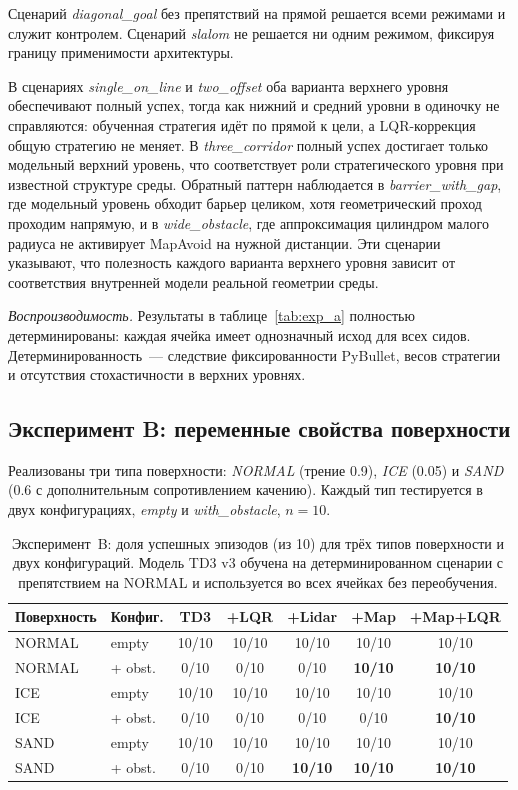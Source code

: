 \documentclass[11pt]{article}
\begin{document}
Сценарий \emph{diagonal\_goal} без препятствий на прямой решается всеми режимами и служит контролем. Сценарий \emph{slalom} не решается ни одним режимом, фиксируя границу применимости архитектуры.

В сценариях \emph{single\_on\_line} и \emph{two\_offset} оба варианта верхнего уровня обеспечивают полный успех, тогда как нижний и средний уровни в одиночку не справляются: обученная стратегия идёт по прямой к цели, а LQR-коррекция общую стратегию не меняет. В \emph{three\_corridor} полный успех достигает только модельный верхний уровень, что соответствует роли стратегического уровня при известной структуре среды. Обратный паттерн наблюдается в \emph{barrier\_with\_gap}, где модельный уровень обходит барьер целиком, хотя геометрический проход проходим напрямую, и в \emph{wide\_obstacle}, где аппроксимация цилиндром малого радиуса не активирует MapAvoid на нужной дистанции. Эти сценарии указывают, что полезность каждого варианта верхнего уровня зависит от соответствия внутренней модели реальной геометрии среды.

\textit{Воспроизводимость.} Результаты в таблице~\ref{tab:exp_a} полностью детерминированы: каждая ячейка имеет однозначный исход для всех сидов. Детерминированность~--- следствие фиксированности PyBullet, весов стратегии и отсутствия стохастичности в верхних уровнях.


\subsection{Эксперимент B: переменные свойства поверхности}
\label{sec:exp_b}

Реализованы три типа поверхности: \emph{NORMAL} (трение 0.9), \emph{ICE} (0.05) и \emph{SAND} (0.6 с дополнительным сопротивлением качению). Каждый тип тестируется в двух конфигурациях, \emph{empty} и \emph{with\_obstacle}, $n = 10$.

\begin{table}[h]
\begin{center}
\begin{tabular}{llccccc}
\toprule
Поверхность & Конфиг. & TD3 & +LQR & +Lidar & +Map & +Map+LQR \\
\midrule
NORMAL & empty     & 10/10 & 10/10 & 10/10 & 10/10 & 10/10 \\
NORMAL & + obst.   & 0/10  & 0/10  & 0/10  & \textbf{10/10} & \textbf{10/10} \\
ICE    & empty     & 10/10 & 10/10 & 10/10 & 10/10 & 10/10 \\
ICE    & + obst.   & 0/10  & 0/10  & 0/10  & 0/10  & \textbf{10/10} \\
SAND   & empty     & 10/10 & 10/10 & 10/10 & 10/10 & 10/10 \\
SAND   & + obst.   & 0/10  & 0/10  & \textbf{10/10}  & \textbf{10/10} & \textbf{10/10} \\
\bottomrule
\end{tabular}
\caption{Эксперимент~B: доля успешных эпизодов (из 10) для трёх типов
поверхности и двух конфигураций. Модель TD3 v3 обучена на детерминированном
сценарии с препятствием на NORMAL и используется во всех ячейках без
переобучения.}
\label{tab:exp_b}
\end{center}
\end{table}
\end{document}
